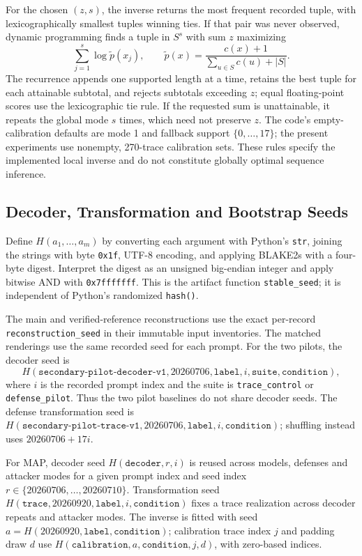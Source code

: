 For the chosen $(z,s)$, the inverse returns the most frequent recorded tuple, with lexicographically smallest tuples winning ties. If that pair was never observed, dynamic programming finds a tuple in $S^s$ with sum $z$ maximizing
\[
 \sum_{j=1}^{s}\log\widetilde p(x_j),
 \qquad
 \widetilde p(x)=\frac{c(x)+1}{\sum_{u\in S}c(u)+|S|}.
\]
The recurrence appends one supported length at a time, retains the best tuple for each attainable subtotal, and rejects subtotals exceeding $z$; equal floating-point scores use the lexicographic tie rule. If the requested sum is unattainable, it repeats the global mode $s$ times, which need not preserve $z$. The code's empty-calibration defaults are mode 1 and fallback support $\{0,\ldots,17\}$; the present experiments use nonempty, 270-trace calibration sets. These rules specify the implemented local inverse and do not constitute globally optimal sequence inference.

\subsection{Decoder, Transformation and Bootstrap Seeds}
Define $H(a_1,\ldots,a_m)$ by converting each argument with Python's \texttt{str}, joining the strings with byte \texttt{0x1f}, UTF-8 encoding, and applying BLAKE2s with a four-byte digest. Interpret the digest as an unsigned big-endian integer and apply bitwise AND with \texttt{0x7fffffff}. This is the artifact function \texttt{stable\_seed}; it is independent of Python's randomized \texttt{hash()}.

The main and verified-reference reconstructions use the exact per-record \texttt{reconstruction\_seed} in their immutable input inventories. The matched renderings use the same recorded seed for each prompt. For the two pilots, the decoder seed is
\[
H(\texttt{secondary-pilot-decoder-v1},20260706,\texttt{label},i,
  \texttt{suite},\texttt{condition}),
\]
where $i$ is the recorded prompt index and the suite is \texttt{trace\_control} or \texttt{defense\_pilot}. Thus the two pilot baselines do not share decoder seeds. The defense transformation seed is $H(\texttt{secondary-pilot-trace-v1},20260706,\texttt{label},i,\texttt{condition})$; shuffling instead uses $20260706+17i$.

For MAP, decoder seed $H(\texttt{decoder},r,i)$ is reused across models, defenses and attacker modes for a given prompt index and seed index $r\in\{20260706,\ldots,20260710\}$. Transformation seed $H(\texttt{trace},20260920,\texttt{label},i,\texttt{condition})$ fixes a trace realization across decoder repeats and attacker modes. The inverse is fitted with seed $a=H(20260920,\texttt{label},\texttt{condition})$; calibration trace index $j$ and padding draw $d$ use $H(\texttt{calibration},a,\texttt{condition},j,d)$, with zero-based indices.

